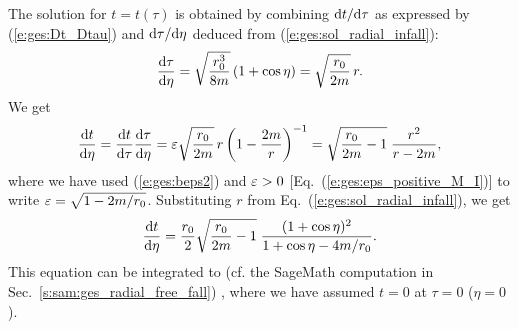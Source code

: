 The solution for $t=t(\tau)$ is obtained by combining $\mathrm{d} t/\mathrm{d}\tau$ as expressed
by (\ref{e:ges:Dt_Dtau}) and $\mathrm{d}\tau/\mathrm{d}\eta$ deduced from (\ref{e:ges:sol_radial_infall}):
\[
    \frac{\mathrm{d}\tau}{\mathrm{d}\eta} = \sqrt{\frac{r_0^3}{8 m}}  \left( 1 + \cos\eta \right)
        = \sqrt{\frac{r_0}{2m}} \, r .
\]
We get
\[
    \frac{\mathrm{d} t}{\mathrm{d}\eta} =  \frac{\mathrm{d} t}{\mathrm{d}\tau} \frac{\mathrm{d}\tau}{\mathrm{d}\eta}
        = \varepsilon \sqrt{\frac{r_0}{2m}} \, r \left(1 - \frac{2m}{r} \right) ^{-1}
        = \sqrt{\frac{r_0}{2m} - 1} \; \frac{r^2}{r - 2m} ,
\]
where we have used (\ref{e:ges:beps2}) and $\varepsilon > 0$ [Eq.~(\ref{e:ges:eps_positive_M_I})]
to write
$\varepsilon = \sqrt{1-2m/r_0}$.
Substituting $r$ from Eq.~(\ref{e:ges:sol_radial_infall}), we get
\[
    \frac{\mathrm{d} t}{\mathrm{d}\eta} =   \frac{r_0}{2} \sqrt{\frac{r_0}{2m} - 1} \;
        \frac{(1+\cos\eta)^2}{1+\cos\eta - 4m/r_0} .
\]
This equation can be integrated to (cf. the \textsf{SageMath} computation in Sec.~\ref{s:sam:ges_radial_free_fall})
\be \label{e:ges:sol_t_radial_infall}
    ,
\ee
where we have assumed $t=0$ at $\tau=0$ ($\eta=0$).

